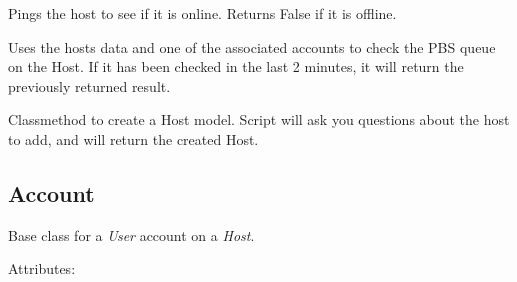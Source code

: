 \documentclass[letterpaper,10pt,english]{sphinxmanual}
\begin{document}
\begin{fulllineitems}
\begin{description}
\end{description}

\begin{fulllineitems}
\label{models:qmpy.Host.check_host}
Pings the host to see if it is online. Returns False if it is
offline.

\end{fulllineitems}


\begin{fulllineitems}
\label{models:qmpy.Host.check_running}
Uses the hosts data and one of the associated accounts to check the PBS
queue on the Host. If it has been checked in the last 2 minutes, it
will return the previously returned result.

\end{fulllineitems}


\begin{fulllineitems}
\label{models:qmpy.Host.create}
Classmethod to create a Host model. Script will ask you questions about
the host to add, and will return the created Host.

\end{fulllineitems}


\end{fulllineitems}



\subsection{Account}
\label{models:account}

\begin{fulllineitems}
\label{models:qmpy.Account}
Base class for a \emph{User} account on a \emph{Host}.
\begin{description}
\item[{Attributes:}] \leavevmode
{}

\end{description}

\end{fulllineitems}
\end{document}

